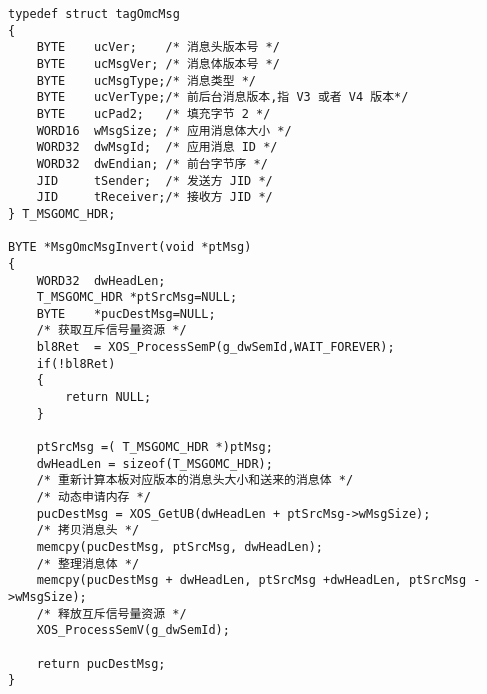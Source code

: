 ﻿\documentclass  [11pt,twocolumn]{article}
\begin{document}
\begin{lstlisting}
typedef struct tagOmcMsg
{
    BYTE    ucVer;    /* 消息头版本号 */
    BYTE    ucMsgVer; /* 消息体版本号 */
    BYTE    ucMsgType;/* 消息类型 */
    BYTE    ucVerType;/* 前后台消息版本,指 V3 或者 V4 版本*/ 
    BYTE    ucPad2;   /* 填充字节 2 */ 
    WORD16  wMsgSize; /* 应用消息体大小 */
    WORD32  dwMsgId;  /* 应用消息 ID */
    WORD32  dwEndian; /* 前台字节序 */
    JID     tSender;  /* 发送方 JID */
    JID     tReceiver;/* 接收方 JID */
} T_MSGOMC_HDR;

BYTE *MsgOmcMsgInvert(void *ptMsg) 
{
    WORD32  dwHeadLen;
    T_MSGOMC_HDR *ptSrcMsg=NULL;
    BYTE    *pucDestMsg=NULL;    
    /* 获取互斥信号量资源 */
    bl8Ret  = XOS_ProcessSemP(g_dwSemId,WAIT_FOREVER);   
    if(!bl8Ret)
    {
        return NULL;
    }

    ptSrcMsg =( T_MSGOMC_HDR *)ptMsg;
    dwHeadLen = sizeof(T_MSGOMC_HDR);
    /* 重新计算本板对应版本的消息头大小和送来的消息体 */
    /* 动态申请内存 */
    pucDestMsg = XOS_GetUB(dwHeadLen + ptSrcMsg->wMsgSize); 
    /* 拷贝消息头 */
    memcpy(pucDestMsg, ptSrcMsg, dwHeadLen);
    /* 整理消息体 */
    memcpy(pucDestMsg + dwHeadLen, ptSrcMsg +dwHeadLen, ptSrcMsg ->wMsgSize); 
    /* 释放互斥信号量资源 */
    XOS_ProcessSemV(g_dwSemId); 

    return pucDestMsg;
}
\end{lstlisting}

\subsection{}
\end{document}
